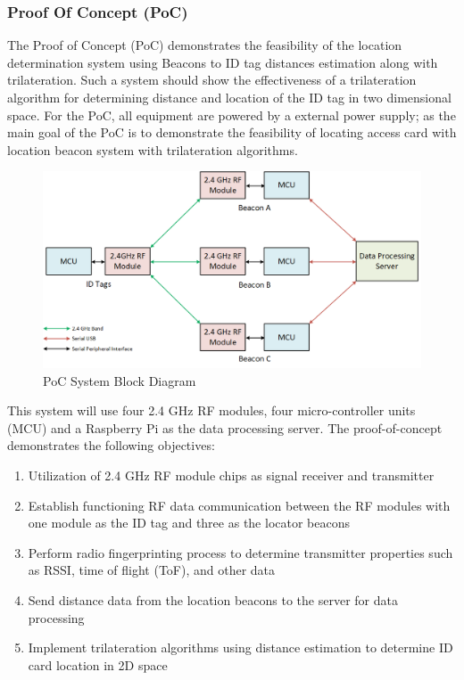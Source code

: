 \break
\subsubsection{Proof Of Concept (PoC)}
The Proof of Concept (\Gls{PoC}) demonstrates the feasibility of the location determination system using Beacons to ID tag distances estimation along with trilateration. Such a system should show the effectiveness of a trilateration algorithm for determining distance and location of the ID tag in two dimensional space. For the PoC, all equipment are powered by a external power supply; as the main goal of the PoC is to demonstrate the feasibility of locating access card with location beacon system with trilateration algorithms.

\begin{figure}[h!]
    \centering
    \includegraphics[width=\linewidth]{./images/01_sys_PoC.png}
    \caption{PoC System Block Diagram}
    \label{fig:PoC_sys_blk}
\end{figure}
\bigskip

This system will use four 2.4 GHz \Gls{RF} modules, four micro-controller units (\Gls{MCU}) and a Raspberry Pi as the data processing server. The proof-of-concept demonstrates the following objectives:

\begin{enumerate}
    \item Utilization of 2.4 GHz RF module chips as signal receiver and transmitter
    \item Establish functioning RF data communication between the RF modules with one module as the ID tag and three as the locator beacons
    \item Perform radio fingerprinting process to determine transmitter properties such as RSSI, time of flight (\Gls{ToF}), and other data
    \item Send distance data from the location beacons to the server for data processing
    \item Implement trilateration algorithms using distance estimation to determine ID card location in 2D space
\end{enumerate}

